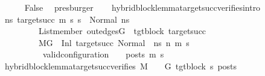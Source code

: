 \begin{isabellebody}
\ \ \ \ \ \ \isamarkupfalse%
\ False\ \isamarkupfalse%
\ presburger\isanewline
\ \ \isamarkupfalse%
\isanewline
{}\isamarkupfalse%
%
\endisatagproof
{\isafoldproof}%
%
\isadelimproof
\isanewline
%
\endisadelimproof
\isanewline
{}\isamarkupfalse%
\ hybrid{\isacharunderscore}{\kern0pt}block{\isacharunderscore}{\kern0pt}lemma{\isacharunderscore}{\kern0pt}target{\isacharunderscore}{\kern0pt}succ{\isacharunderscore}{\kern0pt}verifies{\isacharunderscore}{\kern0pt}intro{\isacharcolon}{\kern0pt}\isanewline
\ \ \ \isanewline
\ \ \ {\isachardoublequoteopen}{\isasymAnd}ns{}{\isacharprime}{\kern0pt}\ target{\isacharunderscore}{\kern0pt}succ\ m{}{\isacharprime}{\kern0pt}\ s{}{\isacharprime}{\kern0pt}{\isachardot}{\kern0pt}\ s{}{\isacharprime}{\kern0pt}\ {\isacharequal}{\kern0pt}\ Normal\ ns{}{\isacharprime}{\kern0pt}\ {\isasymLongrightarrow}\isanewline
\ \ \ \ \ \ \ \ \ \ \ List{\isachardot}{\kern0pt}member\ {\isacharparenleft}{\kern0pt}out{\isacharunderscore}{\kern0pt}edges{\isacharparenleft}{\kern0pt}G{\isacharprime}{\kern0pt}{\isacharparenright}{\kern0pt}\ {\isacharbang}{\kern0pt}\ tgt{\isacharunderscore}{\kern0pt}block{\isacharparenright}{\kern0pt}\ target{\isacharunderscore}{\kern0pt}succ\ {\isasymLongrightarrow}\isanewline
\ \ \ \ \ \ \ \ \ \ \ {\isacharparenleft}{\kern0pt}M{\isacharcomma}{\kern0pt}{\isasymLambda}{\isacharcomma}{\kern0pt}{\isasymGamma}{\isacharcomma}{\kern0pt}{\isasymOmega}{\isacharcomma}{\kern0pt}G{\isacharprime}{\kern0pt}\ {\isasymturnstile}\ {\isacharparenleft}{\kern0pt}Inl\ target{\isacharunderscore}{\kern0pt}succ{\isacharcomma}{\kern0pt}\ {\isacharparenleft}{\kern0pt}Normal\ \ ns{}{\isacharprime}{\kern0pt}{\isacharparenright}{\kern0pt}{\isacharparenright}{\kern0pt}\ {\isacharminus}{\kern0pt}n{\isasymrightarrow}{\isacharasterisk}{\kern0pt}\ {\isacharparenleft}{\kern0pt}m{}{\isacharprime}{\kern0pt}{\isacharcomma}{\kern0pt}\ s{}{\isacharprime}{\kern0pt}{\isacharparenright}{\kern0pt}{\isacharparenright}{\kern0pt}\ {\isasymLongrightarrow}\isanewline
\ \ \ \ \ \ \ \ \ \ \ \ valid{\isacharunderscore}{\kern0pt}configuration\ {\isasymLambda}\ {\isasymGamma}\ {\isasymOmega}\ posts\ m{}{\isacharprime}{\kern0pt}\ s{}{\isacharprime}{\kern0pt}{\isachardoublequoteclose}\isanewline
\ \ \ {\isachardoublequoteopen}hybrid{\isacharunderscore}{\kern0pt}block{\isacharunderscore}{\kern0pt}lemma{\isacharunderscore}{\kern0pt}target{\isacharunderscore}{\kern0pt}succ{\isacharunderscore}{\kern0pt}verifies\ M\ {\isasymLambda}\ {\isasymGamma}\ {\isasymOmega}\ G{\isacharprime}{\kern0pt}\ tgt{\isacharunderscore}{\kern0pt}block\ s{}{\isacharprime}{\kern0pt}\ posts{\isachardoublequoteclose}\isanewline

\end{isabellebody}
